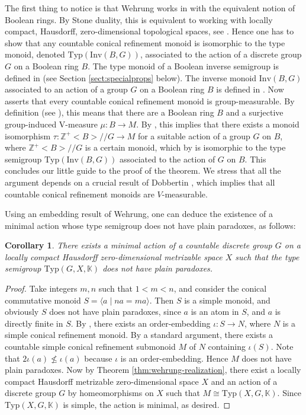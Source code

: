 \documentclass[11pt]{amsart}
\theoremstyle{plain}            %
\newtheorem{corollary}[theorem]{Corollary}
\theoremstyle{definition}       %
\theoremstyle{definition}       %
\theoremstyle{remark}
\newcommand{\Typ}{\mathrm{Typ}}
\def\Z{\mathbb{Z}}
\begin{document}
The first thing to notice is that Wehrung works in \cite{weh} with the equivalent notion of Boolean rings. By Stone duality, this is equivalent to working with locally compact, Hausdorff, zero-dimensional topological spaces, see \cite[Section 1.4]{weh}.
Hence one has to show that any countable conical refinement monoid is isomorphic to the type monoid, denoted $\text{Typ} (\text{Inv} (B,G))$, associated to the action of a discrete group $G$ on a Boolean ring $B$. The type monoid of a Boolean inverse semigroup is defined in \cite[Definition 4.1.3]{weh} (see Section \ref{sect:specialprops} below). The inverse monoid $\text{Inv}(B,G)$ associated to an action of a group $G$ on a Boolean ring $B$ is defined in \cite[Example 4.4.15]{weh}. Now \cite[Theorem 4.8.9]{weh} asserts that every countable conical refinement monoid is group-measurable. By definition (see \cite[Definition 4.8.4]{weh}), this means that there are a Boolean ring $B$ and a surjective group-induced V-measure $\mu \colon B \to M$. By \cite[Theorem 4.7.14]{weh}, this implies that there exists a monoid isomorphism $\tau \colon \Z^+<B>//G \to M$ for a suitable action of a group $G$ on $B$, where $\Z^+<B>//G$ is a certain monoid, which by \cite[Proposition 4.4.20]{weh} is isomorphic to the type semigroup $\text{Typ} (\text{Inv} (B,G))$ associated to the action of $G$ on $B$. This concludes our little guide to the proof of the theorem. We stress that all the argument depends on a crucial result of Dobbertin \cite[Theorem 3.4]{dobbertin}, which implies that all countable conical refinement monoids are $V$-measurable.  

Using an embedding result of Wehrung, one can deduce the existence of a minimal action whose type semigroup does not have plain paradoxes, as follows:

\begin{corollary}
There exists a minimal action of a countable discrete group $G$ on a locally compact Hausdorff zero-dimensional metrizable space $X$ such that the type semigroup $\Typ (G,X,\mathbb K)$ does not have plain paradoxes.
\end{corollary}

\begin{proof} Take integers $m,n$ such that $1<m<n$, and consider the conical commutative monoid $S= \langle a \mid na=ma \rangle$.
Then $S$ is a simple monoid, and obviously $S$ does not have plain paradoxes, since $a$ is an atom in $S$, and $a$ is directly finite in $S$. 
By \cite[Corollary 2.7]{weh1998}, there exists an order-embedding $\iota \colon S \to N$, where $N$ is a simple conical refinement monoid.  By a standard argument, there exists a countable simple conical refinement submonoid $M$ of $N$ containing $\iota (S)$. Note that $2\iota (a)\nleq \iota (a)$ because $\iota $ is an order-embedding. Hence $M$ does not have plain paradoxes. Now by Theorem 
\ref{thm:wehrung-realization}, there exist a locally compact Hausdorff metrizable  zero-dimensional space $X$ and an action of a discrete group $G$ by homeomorphisms on $X$ such that $M\cong \Typ (X,G,\mathbb K)$. Since $\Typ (X,G,\mathbb K)$ is simple, the action is minimal, as desired. 
\end{proof}
\end{document}
